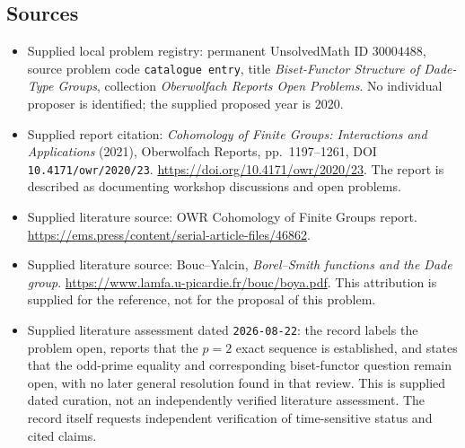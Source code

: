 \documentclass[11pt]{article}
\begin{document}
\subsection{Sources}
\begin{itemize}
\item Supplied local problem registry: permanent UnsolvedMath ID \(30004488\), source problem code \texttt{catalogue entry}, title \emph{Biset-Functor Structure of Dade-Type Groups}, collection \emph{Oberwolfach Reports Open Problems}. No individual proposer is identified; the supplied proposed year is 2020.
\item Supplied report citation: \emph{Cohomology of Finite Groups: Interactions and Applications} (2021), Oberwolfach Reports, pp.\ 1197--1261, DOI \texttt{10.4171/owr/2020/23}. \url{https://doi.org/10.4171/owr/2020/23}. The report is described as documenting workshop discussions and open problems.
\item Supplied literature source: OWR Cohomology of Finite Groups report. \url{https://ems.press/content/serial-article-files/46862}.
\item Supplied literature source: Bouc--Yalcin, \emph{Borel--Smith functions and the Dade group}. \url{https://www.lamfa.u-picardie.fr/bouc/boya.pdf}. This attribution is supplied for the reference, not for the proposal of this problem.
\item Supplied literature assessment dated \texttt{2026-08-22}: the record labels the problem open, reports that the \(p=2\) exact sequence is established, and states that the odd-prime equality and corresponding biset-functor question remain open, with no later general resolution found in that review. This is supplied dated curation, not an independently verified literature assessment. The record itself requests independent verification of time-sensitive status and cited claims.
\end{itemize}
\end{document}
